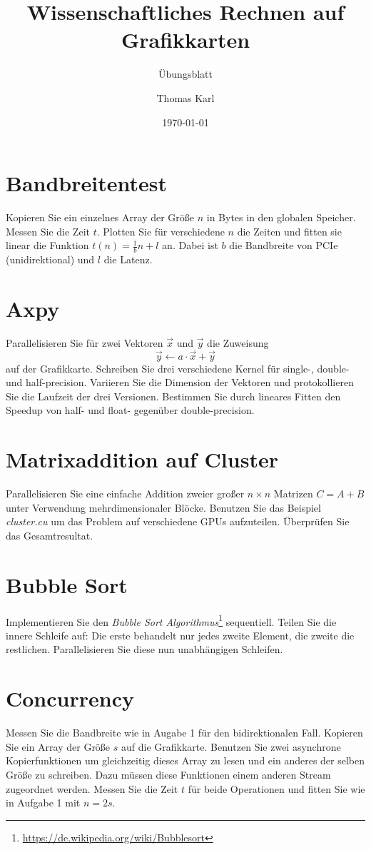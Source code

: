 \documentclass[headsepline=3pt,headinclude=true,12pt,oneside]{scrartcl}
\author{Thomas Karl}
\title{Wissenschaftliches Rechnen auf Grafikkarten}
\subtitle{Übungsblatt}
\date{\today}
\begin{document}
	\maketitle
	
	\section{Bandbreitentest}
	Kopieren Sie ein einzelnes Array der Größe $n$ in Bytes in den globalen Speicher. Messen Sie die Zeit $t$. Plotten Sie für verschiedene $n$ die Zeiten und fitten sie linear die Funktion $t(n) = \frac1bn+l$ an. Dabei ist $b$ die Bandbreite von PCIe (unidirektional) und $l$ die Latenz.
	
	\section{Axpy}
	Parallelisieren Sie für zwei Vektoren $\vec{x}$ und $\vec{y}$ die Zuweisung
	\begin{equation}
		\vec{y} \leftarrow a\cdot\vec{x} + \vec{y} 
	\end{equation}
	auf der Grafikkarte. Schreiben Sie drei verschiedene Kernel für single-, double- und half-precision. Variieren Sie die Dimension der Vektoren und protokollieren Sie die Laufzeit der drei Versionen. Bestimmen Sie durch lineares Fitten den Speedup von half- und float- gegenüber double-precision.
	
	\section{Matrixaddition auf Cluster}
	Parallelisieren Sie eine einfache Addition zweier großer $n\times n$ Matrizen $C = A+B$ unter Verwendung mehrdimensionaler Blöcke. Benutzen Sie das Beispiel \textit{cluster.cu} um das Problem auf verschiedene GPUs aufzuteilen. Überprüfen Sie das Gesamtresultat.
	
	\section{Bubble Sort}
	Implementieren Sie den \textit{Bubble Sort Algorithmus}\footnote{\url{https://de.wikipedia.org/wiki/Bubblesort}} sequentiell. Teilen Sie die innere Schleife auf: Die erste behandelt nur jedes zweite Element, die zweite die restlichen. Parallelisieren Sie diese nun unabhängigen Schleifen.
	
	\section{Concurrency}
	Messen Sie die Bandbreite wie in Augabe 1 für den bidirektionalen Fall. Kopieren Sie ein Array der Größe $s$ auf die Grafikkarte. Benutzen Sie zwei asynchrone Kopierfunktionen um gleichzeitig dieses Array zu lesen und ein anderes der selben Größe zu schreiben. Dazu müssen diese Funktionen einem anderen Stream zugeordnet werden. Messen Sie die Zeit $t$ für beide Operationen und fitten Sie wie in Aufgabe 1 mit $n = 2s$.
	
\end{document}
